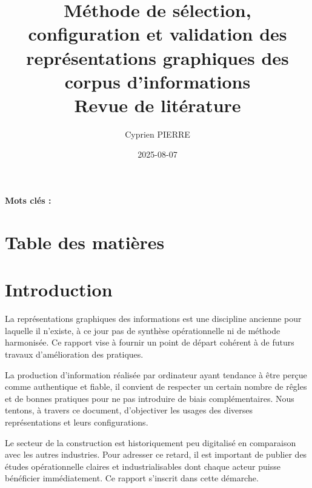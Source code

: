 \documentclass[a4paper,12pt]{article}
\author{Cyprien PIERRE \orcidlink{0009-0009-9040-6795}}
\date{2025-08-07}
\title{Méthode de sélection, configuration et validation des représentations graphiques des corpus d'informations\\\medskip
\large Revue de litérature}
\begin{document}
\maketitle
\begin{abstract}
\end{abstract}

\renewcommand\{\keywordsname\{\textbf{Mots clés : }

\begin{multicols}{2}\raggedcolumns
\section*{Table des matières}
\label{sec:orgbd94b63}
\renewcommand{\contentsname}{\vspace{-2em}}
\setcounter{tocdepth}{2}
\tableofcontents
\section{Introduction}
\label{sec:org41b2122}
La représentations graphiques des informations est une discipline ancienne \autocite{ref?} pour laquelle il n'existe, à ce jour pas de synthèse opérationnelle ni de méthode harmonisée. Ce rapport vise à fournir un point de départ cohérent à de futurs travaux d'amélioration des pratiques.

La production d'information réalisée par ordinateur ayant tendance à être perçue comme authentique et fiable, \autocite{stephenfewIntroduction2012} il convient de respecter un certain nombre de rêgles et de bonnes pratiques pour ne pas introduire de biais complémentaires. Nous tentons, à travers ce document, d'objectiver les usages des diverses représentations et leurs configurations.

Le secteur de la construction est historiquement peu digitalisé en comparaison avec les autres industries.\autocite{safurazabidinBibliometricScientometricMapping2020} Pour adresser ce retard, il est important de publier des études opérationnelle claires et industrialisables dont chaque acteur puisse bénéficier immédiatement. Ce rapport s'inscrit dans cette démarche.


\end{multicols}
\end{document}
